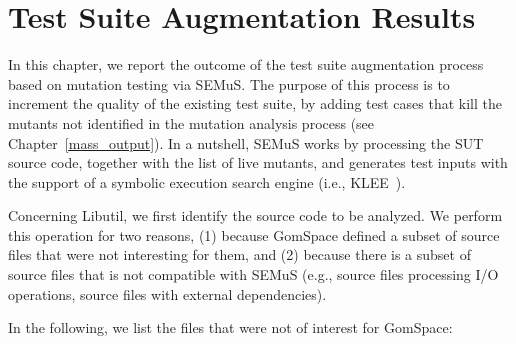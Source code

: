 
\chapter{Test Suite Augmentation Results}

In this chapter, we report the outcome of the test suite augmentation process based on mutation testing via SEMuS. The purpose of this process is to increment the quality of the existing test suite, by adding test cases that kill the mutants not identified in the mutation analysis process (see Chapter~\ref{mass_output}). 
In a nutshell, SEMuS works by processing the SUT source code, together with the list of live mutants, and generates test inputs with the support of a symbolic execution search engine (i.e., KLEE~\cite{cadar2008klee}).


Concerning Libutil, we first identify the source code to be analyzed. We perform this operation for two reasons, (1) because GomSpace defined a subset of source files that were not interesting for them, and (2) because there is a subset of source files that is not compatible with SEMuS (e.g., source files processing I/O operations, source files with external dependencies).  


In the following, we list the files that were not of interest for GomSpace:

